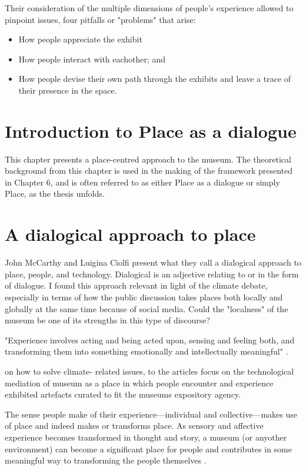 \break
Their consideration of the multiple dimensions of people's experience allowed to pinpoint issues, four pitfalls or "problems" that arise:
\begin{itemize}
    \item How people appreciate the exhibit
    \item How people interact with eachother; and
    \item How people devise their own path through the exhibits and leave a trace of their presence in the space.
\end{itemize}


\section{Introduction to Place as a dialogue}

This chapter presents a place-centred approach to the museum. The theoretical background from this chapter is used in the making of the framework presented in Chapter 6, and is often referred to as either Place as a dialogue or simply Place, as the thesis unfolds. 


\section{A dialogical approach to place}
John McCarthy and Luigina Ciolfi present what they call a dialogical approach to place, people, and technology. Dialogical is an adjective relating to or in the form of dialogue. I found this approach relevant in light of the climate debate, especially in terms of how the public discussion takes places both locally and globally at the same time because of social media. Could the "localness"  of the museum be one of its strengths in this type of discourse? 

 "Experience involves acting and being acted upon, sensing and feeling both, and transforming them into something emotionally and intellectually meaningful" \autocite[p. 250]{mccarthy_place}. 


 on how to solve climate- related issues, to the articles focus on the technological mediation of museum as a place in which people encounter and experience exhibited artefacts curated to fit the museums expository agency.

The sense people make of their experience—individual and collective—makes use of place and indeed makes or transforms place. As sensory and affective experience becomes transformed in thought and story, a museum (or anyother environment) can become a significant place for people and contributes in some meaningful way to transforming the people themselves \autocite[p. 250]{mccarthy_place}.


